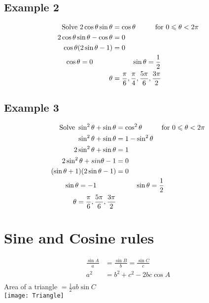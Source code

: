 \documentclass[class=article, crop=false]{standalone}
\begin{document}
\subsection*{Example 2}
\begin{align*}
\text{Solve } 2 \cos \theta \sin \theta & = \cos \theta \hspace*{1cm} \text{for } 0 \leqslant \theta <  2\pi \\
2 \cos \theta \sin \theta - \cos \theta & = 0 \\
\cos \theta (2\sin \theta - 1) & = 0 \\
\cos \theta = 0 \hspace*{1cm} & \hspace*{1cm} \sin \theta = \frac{1}{2} \\ 
\theta & = \frac{\pi}{6}, \frac{\pi}{4}, \frac{5 \pi}{6}, \frac{3 \pi}{2} \\
\end{align*}
\subsection*{Example 3}
\begin{align*}
\text{Solve } \sin^2 \theta + \sin \theta & = \cos^2 \theta \hspace*{1cm} \text{for } 0 \leqslant \theta < 2 \pi \\
\sin^2 \theta + \sin \theta & = 1 - \sin^2 \theta \\
2 \sin^2 \theta + \sin \theta & = 1 \\
2 \sin^2 \theta + sin \theta - 1 & = 0 \\
(\sin \theta + 1)(2 \sin \theta -1) & = 0 \\
\sin \theta = -1 \hspace*{1cm} & \hspace*{1cm} \sin \theta = \frac{1}{2} \\
\theta = \frac{\pi}{6}, \frac{5 \pi}{6}, \frac{3 \pi}{2} & \\ 
\end{align*}
\section*{Sine and Cosine rules}
\begin{align*}
\frac{\sin A}{a} & = \frac{\sin B}{b} = \frac{\sin C}{c} \\
a^2 &= b^2 + c^2 - 2bc \cos A \\ 
\end{align*}
Area of a triangle $ = \frac{1}{2} ab \sin C$ \\ 
\texttt{[image: Triangle]} \\\\
\end{document}
